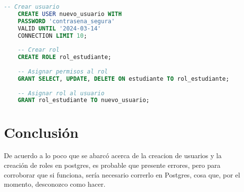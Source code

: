 \documentclass{article}
\begin{document}
\begin{lstlisting}[language=SQL]
	-- Crear usuario
	CREATE USER nuevo_usuario WITH 
	PASSWORD 'contrasena_segura' 
	VALID UNTIL '2024-03-14'
	CONNECTION LIMIT 10;
	
	-- Crear rol
	CREATE ROLE rol_estudiante;
	
	-- Asignar permisos al rol
	GRANT SELECT, UPDATE, DELETE ON estudiante TO rol_estudiante;
	
	-- Asignar rol al usuario
	GRANT rol_estudiante TO nuevo_usuario;
\end{lstlisting}

\section{Conclusión}
De acuerdo a lo poco que se abarcó acerca de la creacion de usuarios y la creación de roles en postgres, es probable que presente errores, pero para corroborar que si funciona, sería necesario correrlo en Postgres, cosa que, por el momento, desconozco como hacer.
\end{document}
